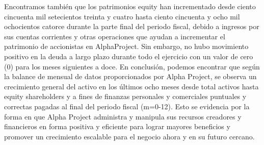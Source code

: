 Encontramos también que los patrimonios equity han incrementado desde ciento cincuenta mil setecientos treinta y cuatro hasta ciento cincuenta y ocho mil ochocientos catorce durante la parte final del periodo fiscal, debido a ingresos por sus cuentas corrientes y otras operaciones que ayudan a incrementar el patrimonio de accionistas en AlphaProject. Sin embargo, no hubo movimiento positivo en la deuda a largo plazo durante todo el ejercicio con un valor de cero (0) para los meses siguientes a doce.
En conclusión, podemos encontrar que según la balance de mensual de datos proporcionados por Alpha Project, se observa un crecimiento general del activo en los últimos ocho meses desde total activos hasta equity shareholders y a fines de finanzas personales y comerciales puntuales y correctas pagadas al final del periodo fiscal (m=0-12). Esto se evidencia por la forma en que Alpha Project administra y manipula sus recursos creadores y financieros en forma positiva y eficiente para lograr mayores beneficios y promover un crecimiento escalable para el negocio ahora y en su futuro cercano.
